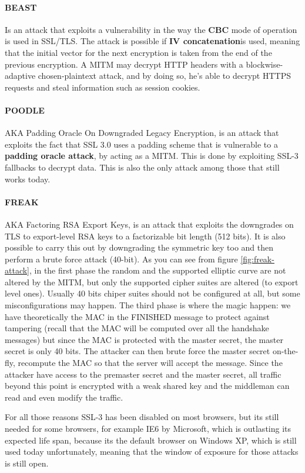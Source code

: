 \paragraph{BEAST} Is an attack that exploits a vulnerability in the way
the \textbf{CBC} mode of operation is used in SSL/TLS. The attack is
possible if \textbf{IV concatenation}is used, meaning that the initial
vector for the next encryption is taken from the end of the previous
encryption. A MITM may decrypt HTTP headers with a blockwise-adaptive
chosen-plaintext attack, and by doing so, he's able to decrypt HTTPS
requests and steal information such as session cookies.
\paragraph{POODLE} AKA Padding Oracle On Downgraded Legacy Encryption,
is an attack that exploits the fact that SSL 3.0 uses a padding scheme
that is vulnerable to a \textbf{padding oracle attack}, by acting as a
MITM. This is done by exploiting SSL-3 fallbacks to decrypt data. This
is also the only attack among those that still works today.
\paragraph{FREAK} AKA Factoring RSA Export Keys, is an attack that
exploits the downgrades on TLS to export-level RSA keys to a
factorizable bit length (512 bits). It is also possible to carry this
out by downgrading the symmetric key too and then perform a brute
force attack (40-bit). As you can see from figure
\ref{fig:freak-attack}, in the first phase the random and the
supported elliptic curve are not altered by the MITM, but only the
supported cipher suites are altered (to export level ones). Usually 40
bits chiper suites should not be configured at all, but some
misconfigurations may happen. The third phase is where the magic
happen: we have theoretically the MAC  in the FINISHED message to
protect against tampering (recall that the MAC will be computed over
all the handshake messages) but since the MAC is protected with the
master secret, the master secret is only 40 bits. The attacker can
then brute force the master secret on-the-fly, recompute the MAC so
that the server will accept the message. Since the attacker have
access to the premaster secret and the master secret, all traffic
beyond this point is encrypted with a weak shared key and the
middleman can read and even modify the traffic.

For all those reasons SSL-3 has been disabled on most browsers, but
its still needed for some browsers, for example IE6 by Microsoft,
which is outlasting its expected life span, because its the default
browser on Windows XP, which is still used today unfortunately,
meaning that the window of exposure for those attacks is still open.

